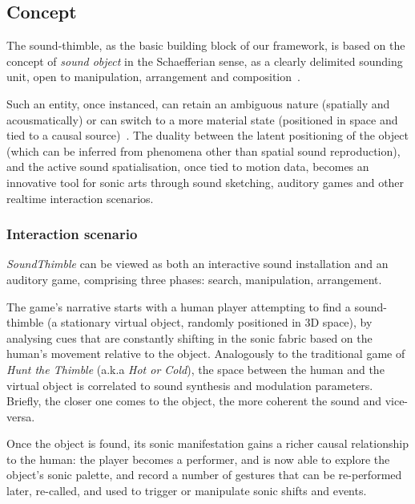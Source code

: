 \documentclass{nime-alternate}
\begin{document}
\subsection{Concept}


The sound-thimble, as the basic building block of our framework, is based on the concept of \textit{sound object} in the Schaefferian sense, as a clearly delimited sounding unit, open to manipulation, arrangement and composition~\cite{schaeffer1998solfege}.

Such an entity, once instanced, can retain an ambiguous nature (spatially and acousmatically) or can switch to a more material state (positioned in space and tied to a causal source)~\cite{soundunseen}. The duality between the latent positioning of the object (which can be inferred from phenomena other than spatial sound reproduction), and the active sound spatialisation, once tied to motion data, becomes an innovative tool for sonic arts through sound sketching, auditory games and other realtime interaction scenarios.

\subsubsection{Interaction scenario}

\textit{SoundThimble} can be viewed as both an interactive sound installation and an auditory game, comprising three phases: search, manipulation, arrangement.


The game's narrative starts with a human player attempting to find a sound-thimble (a stationary virtual object, randomly positioned in 3D space), by analysing cues that are constantly shifting in the sonic fabric based on the human's movement relative to the object. Analogously to the traditional game of \textit{Hunt the Thimble} (a.k.a \textit{Hot or Cold}), the space between the human and the virtual object is correlated to sound synthesis and modulation parameters. Briefly, the closer one comes to the object, the more coherent the sound and vice-versa. 

Once the object is found, its sonic manifestation gains a richer causal relationship to the human: the player becomes a performer, and is now able to explore the object's sonic palette, and record a number of gestures that can be re-performed later, re-called, and used to trigger or manipulate sonic shifts and events.
\end{document}
